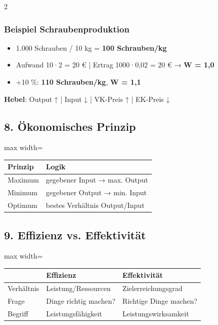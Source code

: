\documentclass[10pt, a4paper]{article}
\begin{document}
\begin{multicols}{2}
\subsubsection{Beispiel Schraubenproduktion}
\begin{itemize}
  \item 1.000 Schrauben / 10 kg = \textbf{100 Schrauben/kg}
  \item Aufwand 10·2 = 20 € | Ertrag 1000·0,02 = 20 € → \textbf{W = 1,0}
  \item +10 \%: \textbf{110 Schrauben/kg}, \textbf{W = 1,1}
\end{itemize}

\textbf{Hebel}: Output ↑ | Input ↓ | VK-Preis ↑ | EK-Preis ↓



\subsection{8. Ökonomisches Prinzip}


{\small
\begin{adjustbox}{max width=\linewidth}
{\scriptsize
\begin{tabular}{ll}
\toprule
\textbf{Prinzip} & \textbf{Logik} \\
\midrule
Maximum & gegebener Input → max. Output \\
Minimum & gegebener Output → min. Input \\
Optimum & bestes Verhältnis Output/Input \\
\bottomrule
\end{tabular}
}
\end{adjustbox}
}



\subsection{9. Effizienz vs. Effektivität}


{\small
\begin{adjustbox}{max width=\linewidth}
{\scriptsize
\begin{tabular}{lll}
\toprule
\textbf{} & \textbf{Effizienz} & \textbf{Effektivität} \\
\midrule
Verhältnis & Leistung/Ressourcen & Zielerreichungsgrad \\
Frage & Dinge richtig machen? & Richtige Dinge machen? \\
Begriff & Leistungsfähigkeit & Leistungswirksamkeit \\
\bottomrule
\end{tabular}
}
\end{adjustbox}
}




\end{multicols}
\end{document}
